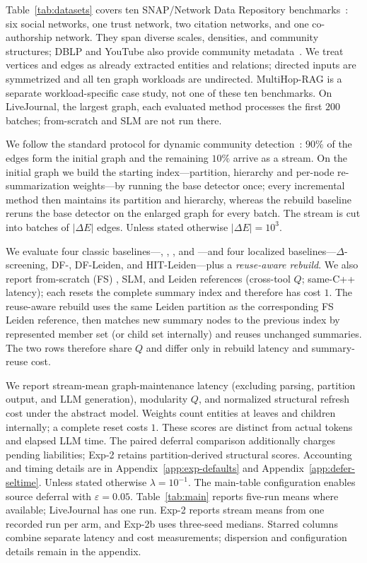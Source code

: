  Table~\ref{tab:datasets} covers ten SNAP/Network Data
Repository benchmarks~\cite{snapnets,nr}: six social networks, one trust
network, two citation networks, and one co-authorship network. They span
diverse scales, densities, and community structures; DBLP and YouTube also
provide community metadata~\cite{yang2012groundtruth}. We treat vertices and
edges as already extracted entities and relations; directed inputs are
symmetrized and all ten graph workloads are undirected. MultiHop-RAG is a separate
workload-specific case study, not one of these ten benchmarks. On LiveJournal,
the largest graph, each evaluated method processes the first $200$ batches;
from-scratch \Louvain{} and SLM are not run there.

 We follow the standard protocol for dynamic community
detection~\cite{zhuang2019dynamo}: $90\%$ of the edges form the initial graph
and the remaining $10\%$ arrive as a stream. On the initial graph we build the
starting index---partition, hierarchy and per-node re-summarization
weights---by running the base detector once; every incremental method then
maintains its partition and hierarchy, whereas the rebuild baseline reruns the
base detector on the enlarged graph for every batch. The stream is cut into
batches of $|\Delta E|$ edges.
Unless stated otherwise $|\Delta E| = 10^3$.

 We evaluate four classic baselines---\DynaMo{}, \Batch{},
\GreMod{}, and \QCA{}---and four localized baselines---$\Delta$-screening,
DF-\Louvain{}, DF-Leiden, and HIT-Leiden---plus a \emph{reuse-aware rebuild}.
We also report from-scratch (FS) \Louvain{}, SLM, and Leiden references
(cross-tool $Q$; same-C++ latency); each resets the complete summary index and
therefore has cost $1$. The reuse-aware rebuild uses the same Leiden partition
as the corresponding FS Leiden reference, then matches new summary nodes to the
previous index by represented member set (or child set internally) and reuses
unchanged summaries. The two rows therefore share $Q$ and differ only in
rebuild latency and summary-reuse cost.

 We report stream-mean graph-maintenance
latency (excluding parsing, partition output, and LLM generation), modularity
$Q$, and normalized structural refresh cost under the abstract model.
Weights count entities at leaves and children internally; a complete reset
costs $1$. These scores are distinct from actual tokens and elapsed LLM time.
The paired deferral comparison additionally charges pending liabilities;
Exp-2 retains partition-derived structural scores. Accounting and timing
details are in Appendix~\ref{app:exp-defaults} and
Appendix~\ref{app:defer-seltime}.
Unless stated otherwise $\lambda=10^{-1}$. The main-table configuration
enables source deferral with $\varepsilon=0.05$. Table~\ref{tab:main}
reports five-run means where available; LiveJournal has one run. Exp-2
reports stream means from one recorded run per arm, and Exp-2b uses
three-seed medians. Starred columns combine separate latency and cost
measurements; dispersion and configuration details remain in the appendix.

